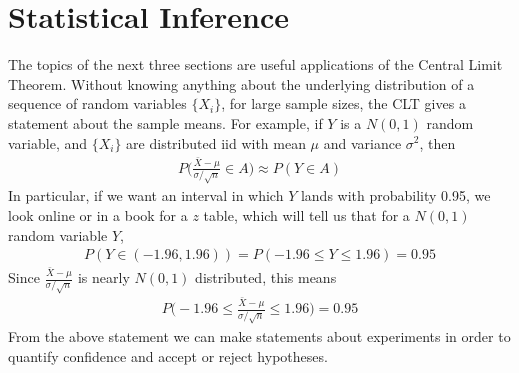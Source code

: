 \documentclass[11pt,letterpaper]{article}
\numberwithin{theorem}{section}
\numberwithin{definition}{section}
\numberwithin{lemma}{section}
\numberwithin{corollary}{section}
\numberwithin{proposition}{section}
\theoremstyle{definition}
\numberwithin{remark}{section}
\numberwithin{claim}{section}
\numberwithin{observation}{section}
\numberwithin{fact}{section}
\numberwithin{assumption}{section}
\numberwithin{example}{section}
\numberwithin{exercise}{section}
\begin{document}
\newpage

\section{Statistical Inference}
The topics of the next three sections are useful applications of the Central Limit Theorem. Without knowing anything about the underlying distribution of a sequence of random variables $\{X_i\}$, for large sample sizes, the CLT gives a statement about the sample means. For example, if $Y$ is a $N(0,1)$ random variable, and $\{X_i\}$ are distributed iid with mean $\mu$ and variance $\sigma^2$, then 
\begin{align*}
P\Big(\frac{\bar{X}- \mu}{\sigma/\sqrt{n}} \in A \Big) \approx P(Y \in A)
\end{align*}
In particular, if we want an interval in which $Y$ lands with probability 0.95, we look online or in a book for a $z$ table, which will tell us that for a $N(0,1)$ random variable $Y$,
\begin{align*}
P(Y \in (-1.96,1.96)) = P(-1.96 \leq Y \leq 1.96) = 0.95
\end{align*}
Since $\frac{\bar{X}- \mu}{\sigma/\sqrt{n}}$ is nearly $N(0,1)$ distributed, this means
\begin{align*}
P\Big(-1.96 \leq \frac{\bar{X}- \mu}{\sigma/\sqrt{n}} \leq 1.96 \Big) = 0.95
\end{align*}
From the above statement we can make statements about experiments in order to quantify confidence and accept or reject hypotheses.
\end{document}
